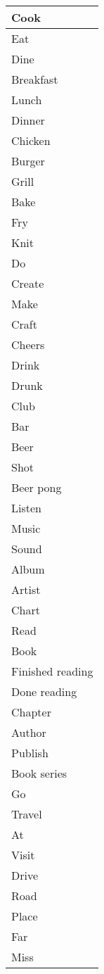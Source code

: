 \begin{longtable}{|p{3cm}|}
Cook\\ \hline
Eat\\ \hline
Dine\\ \hline
Breakfast\\ \hline
Lunch\\ \hline
Dinner\\ \hline
Chicken\\ \hline
Burger\\ \hline
Grill\\ \hline
Bake\\ \hline
Fry\\ \hline
Knit\\ \hline
Do\\ \hline
Create\\ \hline
Make\\ \hline
Craft\\ \hline
Cheers\\ \hline
Drink\\ \hline
Drunk\\ \hline
Club\\ \hline
Bar\\ \hline
Beer\\ \hline
Shot\\ \hline
Beer pong\\ \hline
Listen\\ \hline
Music\\ \hline
Sound\\ \hline
Album\\ \hline
Artist\\ \hline
Chart\\ \hline
Read\\ \hline
Book\\ \hline
Finished reading\\ \hline
Done reading\\ \hline
Chapter\\ \hline
Author\\ \hline
Publish\\ \hline
Book series\\ \hline
Go\\ \hline
Travel\\ \hline
At\\ \hline
Visit\\ \hline
Drive\\ \hline
Road\\ \hline
Place\\ \hline
Far\\ \hline
Miss\\ \hline

\end{longtable}
